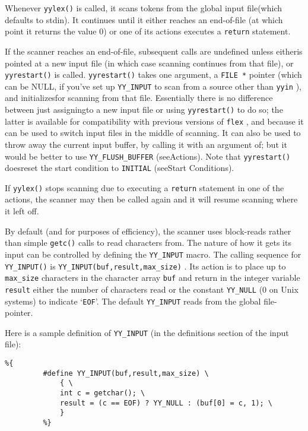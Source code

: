 \documentclass[openany,oneside]{book}
\begin{document}
Whenever \verb`yylex()` is called, it scans tokens from the global input
file(which defaults to stdin).  It continues until it
either reaches an end-of-file (at which point it returns the value 0) or
one of its actions executes a \verb`return` statement.

If the scanner reaches an end-of-file, subsequent calls are undefined
unless eitheris pointed at a new input file (in which case
scanning continues from that file), or \verb`yyrestart()` is called. \verb`yyrestart()` takes one argument, a \verb`FILE *` pointer (which
can be NULL, if you've set up \verb`YY_INPUT` to scan from a source other
than \verb`yyin` ), and initializesfor scanning from that
file.  Essentially there is no difference between just assigningto a new input file or using \verb`yyrestart()` to do so;
the latter is available for compatibility with previous versions of \verb`flex` , and because it can be used to switch input files in the
middle of scanning.  It can also be used to throw away the current input
buffer, by calling it with an argument of; but it would be
better to use \verb`YY_FLUSH_BUFFER` (seeActions).  Note that \verb`yyrestart()` doesreset the start condition to \verb`INITIAL` (seeStart Conditions).

If \verb`yylex()` stops scanning due to executing a \verb`return` statement in one of the actions, the scanner may then be called again
and it will resume scanning where it left off.

By default (and for purposes of efficiency), the scanner uses
block-reads rather than simple \verb`getc()` calls to read characters
from.  The nature of how it gets its input can be controlled
by defining the \verb`YY_INPUT` macro.  The calling sequence for \verb`YY_INPUT()` is \verb`YY_INPUT(buf,result,max_size)` .  Its action
is to place up to \verb`max_size` characters in the character array \verb`buf` and return in the integer variable \verb`result` either the
number of characters read or the constant \verb`YY_NULL` (0 on Unix
systems) to indicate ‘\verb`EOF`’.  The default \verb`YY_INPUT` reads from
the global file-pointer.

Here is a sample definition of \verb`YY_INPUT` (in the definitions
section of the input file):
\begin{verbatim}
%{
         #define YY_INPUT(buf,result,max_size) \
             { \
             int c = getchar(); \
             result = (c == EOF) ? YY_NULL : (buf[0] = c, 1); \
             }
         %}
\end{verbatim}
\end{document}

